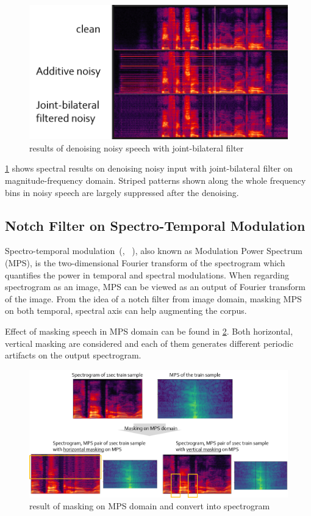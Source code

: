 \documentclass[10pt,twocolumn,letterpaper]{article}
\begin{document}
\begin{figure}[h]
   \centering
   \includegraphics[width=\linewidth]{jbfilter_result_v2}
   \caption{results of denoising noisy speech with joint-bilateral filter}
   \label{fig:jbfilter_result}
\end{figure}

\cref{fig:jbfilter_result} shows spectral results on denoising noisy input with joint-bilateral filter on 
magnitude-frequency domain. Striped patterns shown along the whole frequency bins in noisy speech are 
largely suppressed after the denoising. 

\subsection{Notch Filter on Spectro-Temporal Modulation}
\label{sec:notch}
Spectro-temporal modulation~(\cite{chi1999spectro}, ~\cite{singh2003modulation}), also known as 
Modulation Power Spectrum (MPS), is the two-dimensional Fourier transform of the spectrogram which 
quantifies the power in temporal and spectral modulations. When regarding spectrogram as an image,
MPS can be viewed as an output of Fourier transform of the image. From the idea of a notch filter from
image domain, masking MPS on both temporal, spectral axis can help augmenting the corpus.

Effect of masking speech in MPS domain can be found in \cref{fig:mps_result}. Both horizontal, vertical
masking are considered and each of them generates different periodic artifacts on the output spectrogram. 

\begin{figure}[h]
   \centering
   \includegraphics[width=\linewidth]{mps_result}
   \caption{result of masking on MPS domain and convert into spectrogram}
   \label{fig:mps_result}
\end{figure}
\end{document}
